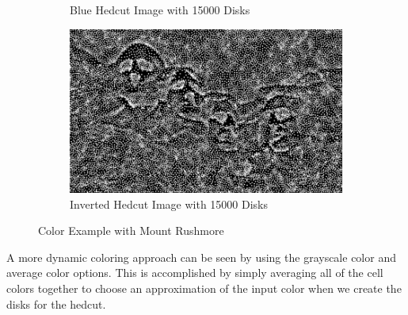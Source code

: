 \documentclass[11pt]{article}
\begin{document}
\begin{figure}[H]
\begin{subfigure}[b]{.48\linewidth}
		\caption{Blue Hedcut Image with 15000 Disks}
		\label{fig:mountRusmoreBlue}
	\end{subfigure}
	\begin{subfigure}[b]{.48\linewidth}
		\includegraphics[width=\linewidth]{Mount-Rushmore-Inverted-15000}
		\caption{Inverted Hedcut Image with 15000 Disks}
		\label{fig:mountRusmoreInverted}
	\end{subfigure}
	\caption{Color Example with Mount Rushmore}
	\label{fig:mountRushmoreEx}
\end{figure}

A more dynamic coloring approach can be seen by using the grayscale color and average color options. This is accomplished by simply averaging all of the cell colors together to choose an approximation of the input color when we create the disks for the hedcut.
\end{document}
